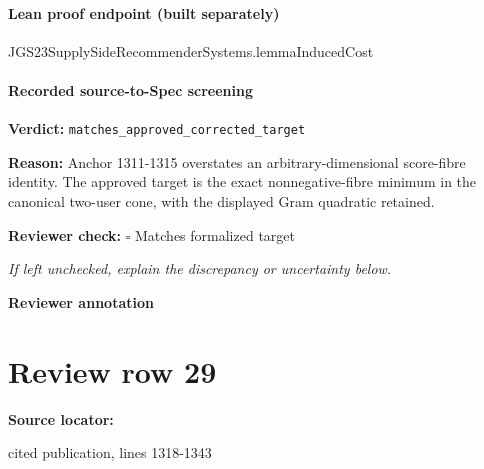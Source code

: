 \documentclass[10pt]{article}
\newcommand{\reviewerbox}{%
  \par\noindent\fbox{\parbox{0.96\linewidth}{\rule{0pt}{0.38in}}}\par
}
\newcommand{\reviewmatch}[1]{%
  \par\noindent\textbf{Reviewer check:} $\square$\; #1\par
  \noindent\emph{If left unchecked, explain the discrepancy or uncertainty below.}\par
}
\begin{document}
\paragraph{Lean proof endpoint (built separately)}\begin{ReviewVerbatim}
JGS23SupplySideRecommenderSystems.lemmaInducedCost
\end{ReviewVerbatim}

\paragraph{Recorded source-to-Spec screening}
\textbf{Verdict:} \texttt{matches\_approved\_corrected\_target}
\\
{\raggedright
\textbf{Reason:} Anchor 1311-\allowbreak{}1315 overstates an arbitrary-\allowbreak{}dimensional score-\allowbreak{}fibre identity.\allowbreak{}  The approved target is the exact nonnegative-\allowbreak{}fibre minimum in the canonical two-\allowbreak{}user cone, with the displayed Gram quadratic retained.\allowbreak{}
\par}
\reviewmatch{Matches formalized target}
\noindent\textbf{Reviewer annotation}\par
\reviewerbox
\clearpage
\hypertarget{source-claim-14a8a2c4e76cf5f6}{}
\section*{Review row 29}
\textbf{Source locator:} {\footnotesize\raggedright cited publication, lines 1318-\allowbreak{}1343\par}
\end{document}
